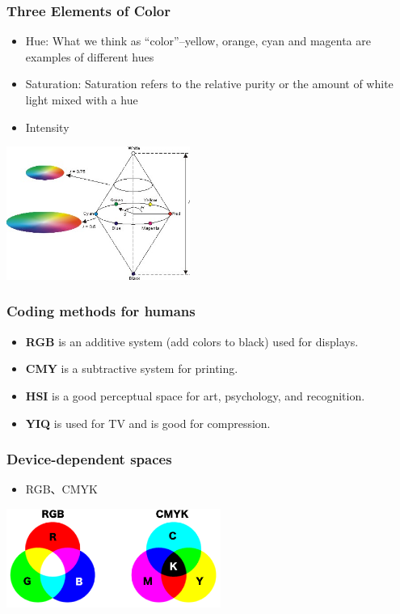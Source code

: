 \documentclass[notheorems,serif,table,compress]{beamer}  %
\begin{document}
\begin{frame}
\frametitle{Three Elements of Color}
\begin{itemize}
\item Hue: What we think as ``color''--yellow, orange, cyan and magenta are examples of different hues
\item Saturation: Saturation refers to the relative purity or the amount of white light mixed with a hue
\item Intensity
\end{itemize}
\centering\includegraphics[width=6cm]{HSIColorModel.jpg}
\end{frame}


\begin{frame}
\frametitle{Coding methods for humans}
\begin{itemize}
\item \textbf{RGB} is an additive system (add colors to black) used for displays.
\item \textbf{CMY} is a subtractive system for printing.
\item \textbf{HSI} is a good perceptual space for art, psychology, and recognition.
\item \textbf{YIQ} is used for TV and is good for compression. 
\end{itemize}
\end{frame}


\begin{frame}
\frametitle{Device-dependent spaces}
\begin{itemize}
\item RGB、CMYK
\end{itemize}

\centering\includegraphics[width=7cm]{RGB_CMYK.png}
\end{frame}
\end{document}
